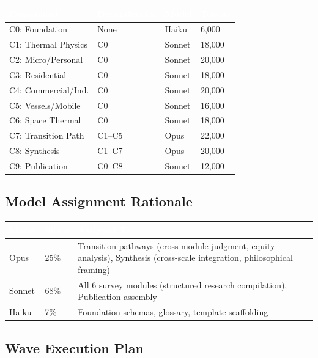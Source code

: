 \documentclass[11pt,letterpaper]{article}
\newcommand{\tableheader}[1]{\textbf{\sffamily\textcolor{white}{#1}}}
\begin{document}
\begin{center}
\begin{tabularx}{\textwidth}{L{2.5cm}L{2.5cm}C{1.5cm}C{1.5cm}}
\toprule
{}
\tableheader{Component} & \tableheader{Dependencies} & \tableheader{Model} & \tableheader{Tokens} \\
\midrule
C0: Foundation & None & Haiku & 6,000 \\
C1: Thermal Physics & C0 & Sonnet & 18,000 \\
C2: Micro/Personal & C0 & Sonnet & 20,000 \\
C3: Residential & C0 & Sonnet & 18,000 \\
C4: Commercial/Ind. & C0 & Sonnet & 20,000 \\
C5: Vessels/Mobile & C0 & Sonnet & 16,000 \\
C6: Space Thermal & C0 & Sonnet & 18,000 \\
C7: Transition Path & C1--C5 & Opus & 22,000 \\
C8: Synthesis & C1--C7 & Opus & 20,000 \\
C9: Publication & C0--C8 & Sonnet & 12,000 \\
\bottomrule
\end{tabularx}
\end{center}

\subsection{Model Assignment Rationale}

\begin{center}
\begin{tabularx}{\textwidth}{C{1.5cm}C{1.5cm}X}
\toprule
{}
\tableheader{Model} & \tableheader{Share} & \tableheader{Assigned To} \\
\midrule
Opus & 25\% & Transition pathways (cross-module judgment, equity analysis), Synthesis (cross-scale integration, philosophical framing) \\
Sonnet & 68\% & All 6 survey modules (structured research compilation), Publication assembly \\
Haiku & 7\% & Foundation schemas, glossary, template scaffolding \\
\bottomrule
\end{tabularx}
\end{center}

\subsection{Wave Execution Plan}
\end{document}
